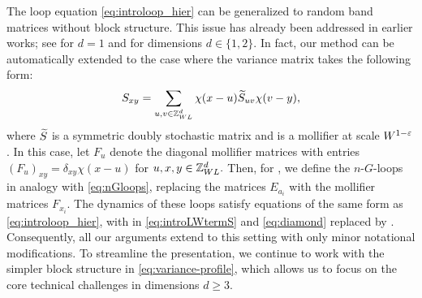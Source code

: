 The loop equation \eqref{eq:introloop_hier} can be generalized to random band matrices without block structure. This issue has already been addressed in earlier works; see \cite{erdHos2025zigzag} for $d=1$ and \cite{Block_reduction} for dimensions $d\in\{1,2\}$. In fact, our method can be automatically extended to the case where the variance matrix takes the following form:
\begin{align*} 
 S_{xy} = \sum_{u,v \in {\mathbb Z}_{WL}^d} \chi(x - u) \widetilde S_{uv} \chi(v - y),
\end{align*} 	
where $\widetilde S$ is a symmetric doubly stochastic matrix and \smash{$\chi : \ZL \to [0,\infty)$} is a mollifier at scale $W^{1 - {\varepsilon}}$. In this case, let $F_u$ denote the diagonal mollifier matrices with entries $(F_{u})_{xy}= \delta_{xy} \chi(x - u)$  for $u, x, y \in {\mathbb Z}_{WL}^d.$ Then, for , we define the $n$-$G$-loops  in analogy with \eqref{eq:nGloops}, replacing the matrices $E_{a_i}$ with the mollifier matrices $F_{x_i}$. The dynamics of these loops satisfy equations of the same form as \eqref{eq:introloop_hier}, with  in \eqref{eq:introLWtermS} and \eqref{eq:diamond} replaced by . Consequently, all  our arguments extend to this setting with only minor notational modifications.
To streamline the presentation, we continue to work with the simpler block structure in \eqref{eq:variance-profile}, which allows us to focus on the core technical challenges in dimensions $d\ge 3$. 




